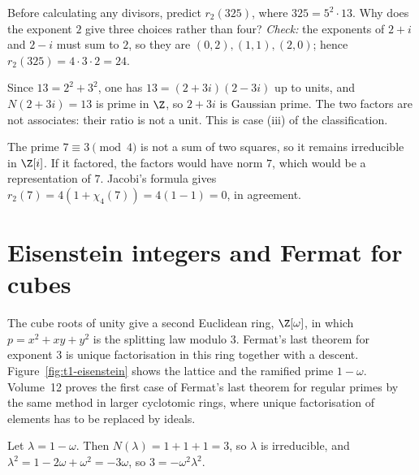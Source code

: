 \begin{think}
Before calculating any divisors, predict $r_2(325)$, where $325=5^2\cdot13$.
Why does the exponent $2$ give three choices rather than four?
\emph{Check:} the exponents of $2+i$ and $2-i$ must sum to $2$, so they are
$(0,2),(1,1),(2,0)$; hence $r_2(325)=4\cdot3\cdot2=24$.
\end{think}

\begin{examplex}[factoring $13$]
Since $13=2^2+3^2$, one has $13=(2+3i)(2-3i)$ up to units, and $N(2+3i)=13$ is prime in $\Z$, so $2+3i$ is Gaussian prime. The two factors are not associates: their ratio is not a unit. This is case (iii) of the classification.
\end{examplex}

\begin{examplex}
The prime $7\equiv 3\pmod 4$ is not a sum of two squares, so it remains irreducible in $\Z[i]$. If it factored, the factors would have norm $7$, which would be a representation of $7$. Jacobi's formula gives $r_2(7)=4(1+\chi_4(7))=4(1-1)=0$, in agreement.
\end{examplex}

\section{Eisenstein integers and Fermat for cubes}

The cube roots of unity give a second Euclidean ring, $\Z[\omega]$, in which $p=x^2+xy+y^2$ is the splitting law modulo $3$. Fermat's last theorem for exponent $3$ is unique factorisation in this ring together with a descent. Figure~\ref{fig:t1-eisenstein} shows the lattice and the ramified prime $1-\omega$. Volume~12 proves the first case of Fermat's last theorem for regular primes by the same method in larger cyclotomic rings, where unique factorisation of elements has to be replaced by ideals.

Let $\lambda=1-\omega$. Then $N(\lambda)=1+1+1=3$, so $\lambda$ is irreducible, and $\lambda^2=1-2\omega+\omega^2=-3\omega$, so $3=-\omega^2\lambda^2$.

